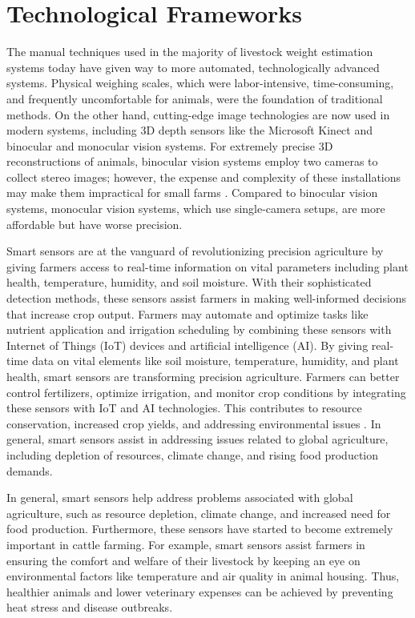 {\section{Technological Frameworks}

The manual techniques used in the majority of livestock weight estimation systems today have given way to more automated, technologically advanced systems. Physical weighing scales, which were labor-intensive, time-consuming, and frequently uncomfortable for animals, were the foundation of traditional methods. On the other hand, cutting-edge image technologies are now used in modern systems, including 3D depth sensors like the Microsoft Kinect and binocular and monocular vision systems. For extremely precise 3D reconstructions of animals, binocular vision systems employ two cameras to collect stereo images; however, the expense and complexity of these installations may make them impractical for small farms \citep{rousing2004stepping}. Compared to binocular vision systems, monocular vision systems, which use single-camera setups, are more affordable but have worse precision.

Smart sensors are at the vanguard of revolutionizing precision agriculture by giving farmers access to real-time information on vital parameters including plant health, temperature, humidity, and soil moisture. With their sophisticated detection methods, these sensors assist farmers in making well-informed decisions that increase crop output. Farmers may automate and optimize tasks like nutrient application and irrigation scheduling by combining these sensors with Internet of Things (IoT) devices and artificial intelligence (AI). By giving real-time data on vital elements like soil moisture, temperature, humidity, and plant health, smart sensors are transforming precision agriculture. Farmers can better control fertilizers, optimize irrigation, and monitor crop conditions by integrating these sensors with IoT and AI technologies. This contributes to resource conservation, increased crop yields, and addressing environmental issues \citep{soussi2024smart}. In general, smart sensors assist in addressing issues related to global agriculture, including depletion of resources, climate change, and rising food production demands.

In general, smart sensors help address problems associated with global agriculture, such as resource depletion, climate change, and increased need for food production. Furthermore, these sensors have started to become extremely important in cattle farming. For example, smart sensors assist farmers in ensuring the comfort and welfare of their livestock by keeping an eye on environmental factors like temperature and air quality in animal housing. Thus, healthier animals and lower veterinary expenses can be achieved by preventing heat stress and disease outbreaks\citep{terence2024systematic}.

}
